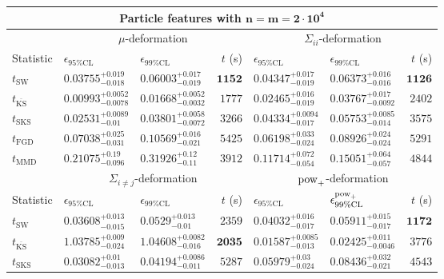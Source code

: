 \begin{tabular}{l|llr|llr}
	\toprule
	\multicolumn{7}{c}{{\bf Particle features with $\mathbf{n=m=2\cdot 10^{4}}$}} \\
	\toprule
	\multicolumn{1}{c}{} & \multicolumn{3}{c}{$\mu$-deformation} & \multicolumn{3}{c}{$\Sigma_{ii}$-deformation} \\
	Statistic & $\epsilon_{95\%\mathrm{CL}}$ & $\epsilon_{99\%\mathrm    {CL}}$ & $t$ (s) & $\epsilon_{95\%\mathrm{CL}}$ & $\epsilon_{99\%\mathrm{CL}}$ & $t$ (s) \\
	\midrule
	$t_{\mathrm{SW}}$ & $0.03755_{-0.018}^{+0.019}$ & $0.06003_{-0.019}^{+0.017}$ & ${\mathbf{1152}}$ & $0.04347_{-0.019}^{+0.017}$ & $0.06373_{-0.016}^{+0.016}$ & ${\mathbf{1126}}$ \\
	$t_{\overline{\mathrm{KS}}}$ & ${\mathbf{0.00993_{-0.0078}^{+0.0052}}}$ & ${\mathbf{0.01668_{-0.0032}^{+0.0052}}}$ & $1777$ & ${\mathbf{0.02465_{-0.019}^{+0.016}}}$ & ${\mathbf{0.03767_{-0.0092}^{+0.017}}}$ & $2402$ \\
	$t_{\mathrm{SKS}}$ & $0.02531_{-0.01}^{+0.0089}$ & $0.03801_{-0.0072}^{+0.0058}$ & $3266$ & $0.04334_{-0.017}^{+0.0094}$ & $0.05753_{-0.014}^{+0.0085}$ & $3575$ \\
	$t_{\mathrm{FGD}}$ & $0.07038_{-0.031}^{+0.025}$ & $0.10569_{-0.021}^{+0.016}$ & $5425$ & $0.06198_{-0.024}^{+0.033}$ & $0.08926_{-0.024}^{+0.024}$ & $5291$ \\
	$t_{\mathrm{MMD}}$ & $0.21075_{-0.096}^{+0.19}$ & $0.31926_{-0.11}^{+0.12}$ & $3912$ & $0.11714_{-0.054}^{+0.072}$ & $0.15051_{-0.057}^{+0.064}$ & $4844$ \\
	\toprule
	\multicolumn{1}{c}{} & \multicolumn{3}{c}{$\Sigma_{i\neq j}$-deformation} & \multicolumn{3}{c}{$\rm{pow}_{+}$-deformation} \\
	Statistic & $\epsilon_{95\%\mathrm{CL}}$ & $\epsilon_{99\%\mathrm{CL}}$ & $t$ (s) & $\epsilon_{95\%\mathrm{CL}}$ & $\epsilon^{\rm   {pow}_{+}}_{99\%\mathrm{CL}}$ & $t$ (s) \\
	\midrule
	$t_{\mathrm{SW}}$ & $0.03608_{-0.015}^{+0.013}$ & $0.0529_{-0.01}^{+0.013}$ & $2359$ & $0.04032_{-0.017}^{+0.016}$ & $0.05911_{-0.017}^{+0.015}$ & ${\mathbf{1172}}$ \\
	$t_{\overline{\mathrm{KS}}}$ & $1.03785_{-0.024}^{+0.009}$ & $1.04608_{-0.016}^{+0.0082}$ & ${\mathbf{2035}}$ & ${\mathbf{0.01587_{-0.013}^{+0.0085}}}$ & ${\mathbf{0.02425_{-0.0046}^{+0.011}}}$ & $3776$ \\
	$t_{\mathrm{SKS}}$ & $0.03082_{-0.013}^{+0.01}$ & $0.04194_{-0.011}^{+0.0086}$ & $5287$ & $0.05979_{-0.024}^{+0.03}$ & $0.08436_{-0.021}^{+0.032}$ & $4543$ \\

\end{tabular}
